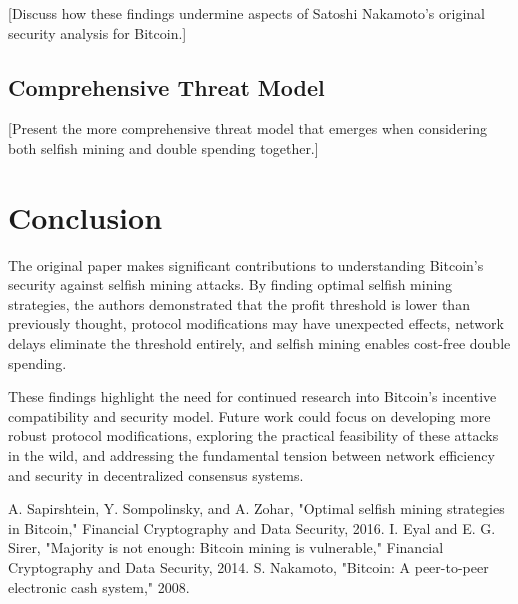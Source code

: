 \documentclass[conference]{IEEEtran}
\begin{document}
[Discuss how these findings undermine aspects of Satoshi Nakamoto's original security analysis for Bitcoin.]

\subsection{Comprehensive Threat Model}

[Present the more comprehensive threat model that emerges when considering both selfish mining and double spending together.]

\section{Conclusion}

The original paper makes significant contributions to understanding Bitcoin's security against selfish mining attacks. By finding optimal selfish mining strategies, the authors demonstrated that the profit threshold is lower than previously thought, protocol modifications may have unexpected effects, network delays eliminate the threshold entirely, and selfish mining enables cost-free double spending.

These findings highlight the need for continued research into Bitcoin's incentive compatibility and security model. Future work could focus on developing more robust protocol modifications, exploring the practical feasibility of these attacks in the wild, and addressing the fundamental tension between network efficiency and security in decentralized consensus systems.


\begin{thebibliography}{00}
     A. Sapirshtein, Y. Sompolinsky, and A. Zohar, "Optimal selfish mining strategies in Bitcoin," Financial Cryptography and Data Security, 2016.
     I. Eyal and E. G. Sirer, "Majority is not enough: Bitcoin mining is vulnerable," Financial Cryptography and Data Security, 2014.
     S. Nakamoto, "Bitcoin: A peer-to-peer electronic cash system," 2008.
\end{thebibliography}
\end{document}

